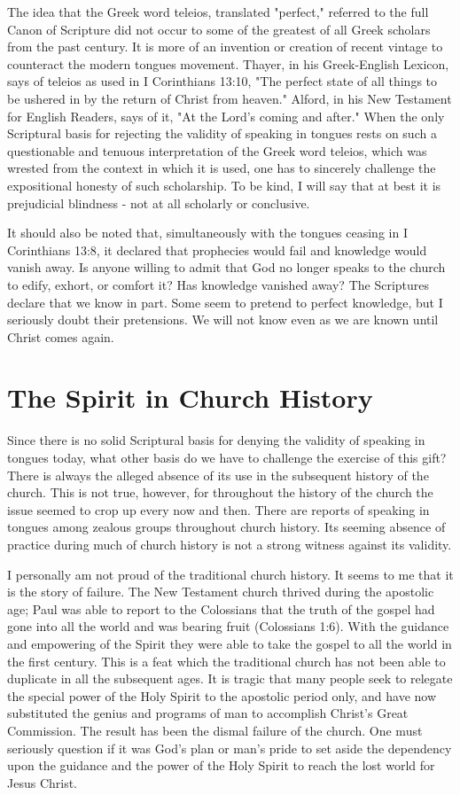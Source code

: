 The idea that the Greek word teleios, translated "perfect," referred to the full Canon of Scripture did not occur to some of the greatest of all Greek scholars from the past century. It is more of an invention or creation of recent vintage to counteract the modern tongues movement. Thayer, in his Greek-English Lexicon, says of teleios as used in I Corinthians 13:10, "The perfect state of all things to be ushered in by the return of Christ from heaven." Alford, in his New Testament for English Readers, says of it, "At the Lord's coming and after." When the only Scriptural basis for rejecting the validity of speaking in tongues rests on such a questionable and tenuous interpretation of the Greek word teleios, which was wrested from the context in which it is used, one has to sincerely challenge the expositional honesty of such scholarship. To be kind, I will say that at best it is prejudicial blindness - not at all scholarly or conclusive. 

It should also be noted that, simultaneously with the tongues ceasing in I Corinthians 13:8, it declared that prophecies would fail and knowledge would vanish away. Is anyone willing to admit that God no longer speaks to the church to edify, exhort, or comfort it? Has knowledge vanished away? The Scriptures declare that we know in part. Some seem to pretend to perfect knowledge, but I seriously doubt their pretensions. We will not know even as we are known until Christ comes again. 

\section*{The Spirit in Church History}

Since there is no solid Scriptural basis for denying the validity of speaking in tongues today, what other basis do we have to challenge the exercise of this gift? There is always the alleged absence of its use in the subsequent history of the church. This is not true, however, for throughout the history of the church the issue seemed to crop up every now and then. There are reports of speaking in tongues among zealous groups throughout church history. Its seeming absence of practice during much of church history is not a strong witness against its validity. 

I personally am not proud of the traditional church history. It seems to me that it is the story of failure. The New Testament church thrived during the apostolic age; Paul was able to report to the Colossians that the truth of the gospel had gone into all the world and was bearing fruit (Colossians 1:6). With the guidance and empowering of the Spirit they were able to take the gospel to all the world in the first century. This is a feat which the traditional church has not been able to duplicate in all the subsequent ages. It is tragic that many people seek to relegate the special power of the Holy Spirit to the apostolic period only, and have now substituted the genius and programs of man to accomplish Christ's Great Commission. The result has been the dismal failure of the church. One must seriously question if it was God's plan or man's pride to set aside the dependency upon the guidance and the power of the Holy Spirit to reach the lost world for Jesus Christ. 

